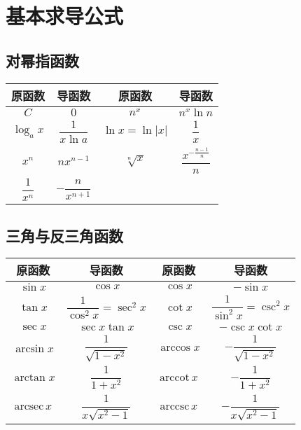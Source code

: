 \documentclass[UTF8, 12pt]{ctexart}
\begin{document}
        \section{基本求导公式}

        \subsection{对幂指函数}

        \begin{center}
            \begin{tabular}{|c|c|c|c|}
                \hline
                原函数 & 导函数 & 原函数 & 导函数\\ \hline
                $C$ & $0$ & $n^x$ & $n^x\ln n$ \\ \hline
                $\log_ax$ & $\dfrac{1}{x\ln a}$ & $\ln x=\ln\vert x\vert$ & $\dfrac{1}{x}$ \\ \hline
                $x^n$ & $nx^{n-1}$ & $\sqrt[n]{x}$ & $\dfrac{x^{-\frac{n-1}{n}}}{n}$ \\ \hline
                $\dfrac{1}{x^n}$ & $-\dfrac{n}{x^{n+1}}$ & & \\
                \hline
            \end{tabular}
        \end{center}

        \subsection{三角与反三角函数}

        \begin{center}
            \begin{tabular}{|c|c|c|c|}
                \hline
                原函数 & 导函数 & 原函数 & 导函数\\ \hline
                $\sin x$ & $\cos x$ & $\cos x$ & $-\sin x$ \\ \hline
                $\tan x$ & $\dfrac{1}{\cos^2x}=\sec^2x$ & $\cot x$ & $\dfrac{1}{\sin^2x}=\csc^2x$ \\ \hline
                $\sec x$ & $\sec x\tan x$ & $\csc x$ & $-\csc x\cot x$ \\ \hline
                $\arcsin x$ & $\dfrac{1}{\sqrt{1-x^2}}$ & $\arccos x$ & $-\dfrac{1}{\sqrt{1-x^2}}$ \\ \hline
                $\arctan x$ & $\dfrac{1}{1+x^2}$ & $\textrm{arccot}\,x$ & $-\dfrac{1}{1+x^2}$ \\ \hline
                $\textrm{arcsec}\,x$ & $\dfrac{1}{x\sqrt{x^2-1}}$ & $\textrm{arccsc}\,x$ & $-\dfrac{1}{x\sqrt{x^2-1}}$ \\
                \hline
            \end{tabular}
        \end{center}
\end{document}
